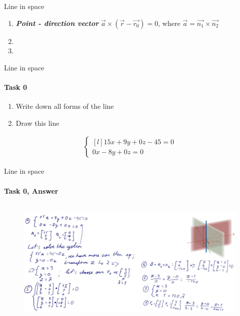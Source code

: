 \documentclass[aspectratio=169]{beamer}
\begin{document}
\begin{frame}[t]{Line in space}
\begin{multicols}{2}
\begin{enumerate}
            \item \textbf{\textit{Point - direction vector}} $\vec{a} \times (\vec{r}-\vec{r_0}) = 0$, where $\vec{a} = \vec{n_1}\times\vec{n_2}$
            \item[\vspace{\fill}]
            \item[\vspace{\fill}]
        \end{enumerate}
    \end{multicols}
\end{frame}

\begin{frame}[t]{Line in space}
    \framesubtitle{Task 0}
    \begin{minipage}{0.49\textwidth}
        \begin{enumerate}
            \item Write down all forms of the line
            \item Draw this line
        \end{enumerate}

    \end{minipage}
    \begin{minipage}{0.5\textwidth}
        \begin{align*}
            \left\{\begin{matrix*}[l]
                       15x+9y+0z-45=0\\
                       0x-8y+0z=0
                   \end{matrix*}\right.
        \end{align*}
    \end{minipage}
\end{frame}

\begin{frame}[t]{Line in space}
    \framesubtitle{Task 0, Answer}
    \vspace{-0.6cm}
    \begin{figure}[H]
        \href{https://www.geogebra.org/3d/mfyfgc9z}{
            \centering\includegraphics[height=6cm,width=1\textwidth,keepaspectratio]{line_in_space_ans.png}}
        \label{fig:line_in_space_ans.png}
    \end{figure}
\end{frame}
\end{document}
